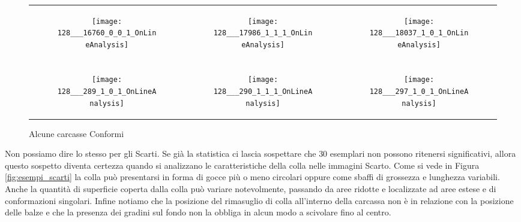 \begin{figure}[ht] %
  \begin{center}
    \begin{tabular}{ccc}

  \begin{subfigure}{.3\linewidth}
    \centering\texttt{[image: 128\_\_\_16760\_0\_0\_1\_OnLineAnalysis]}
    \caption{}
  \end{subfigure} &

  \begin{subfigure}{.3\linewidth}
      \texttt{[image: 128\_\_\_17986\_1\_1\_1\_OnLineAnalysis]}
      \caption{}
    \end{subfigure} &

  \begin{subfigure}{.3\linewidth}
      \texttt{[image: 128\_\_\_18037\_1\_0\_1\_OnLineAnalysis]}
      \caption{}
    \end{subfigure} \\ \\

  \begin{subfigure}{.3\linewidth}
      \texttt{[image: 128\_\_\_289\_1\_0\_1\_OnLineAnalysis]}
      \caption{}
    \end{subfigure} &

  \begin{subfigure}{.3\linewidth}
      \texttt{[image: 128\_\_\_290\_1\_1\_1\_OnLineAnalysis]}
      \caption{}
    \end{subfigure} &

    \begin{subfigure}{.3\linewidth}
      \texttt{[image: 128\_\_\_297\_1\_0\_1\_OnLineAnalysis]}
      \caption{}
    \end{subfigure} \\

    \end{tabular}
    \caption{Alcune carcasse Conformi}
    \label{fig:esempi_conformi}
  \end{center}
\end{figure}


Non possiamo dire lo stesso per gli Scarti.
Se già la statistica ci lascia sospettare che $30$ esemplari non possono ritenersi significativi, allora questo sospetto diventa certezza quando si analizzano le caratteristiche della colla nelle immagini Scarto.  
Come si vede in Figura \ref{fig:esempi_scarti} la colla può presentarsi in forma di gocce più o meno circolari oppure come sbaffi di grossezza e lunghezza variabili.
Anche la quantità di superficie coperta dalla colla può variare notevolmente, passando da aree ridotte e localizzate ad aree estese e di conformazioni singolari.
Infine notiamo che la posizione del rimasuglio di colla all'interno della carcassa non è in relazione con la posizione delle balze e che la presenza dei gradini sul fondo non la obbliga in alcun modo a scivolare fino al centro.

